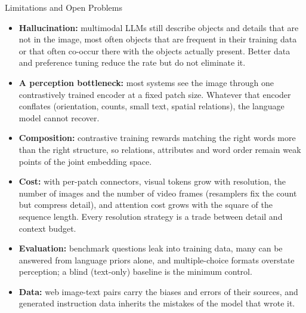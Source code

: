 \begin{frame}{Limitations and Open Problems}
  \begin{itemize}\footnotesize\itemsep0.3em
    \item \textbf{Hallucination:} multimodal LLMs still describe objects and details that are not in the image, most often objects that are frequent in their training data or that often co-occur there with the objects actually present. Better data and preference tuning reduce the rate but do not eliminate it.
    \item \textbf{A perception bottleneck:} most systems see the image through one contrastively trained encoder at a fixed patch size. Whatever that encoder conflates (orientation, counts, small text, spatial relations), the language model cannot recover.
    \item \textbf{Composition:} contrastive training rewards matching the right words more than the right structure, so relations, attributes and word order remain weak points of the joint embedding space.
    \item \textbf{Cost:} with per-patch connectors, visual tokens grow with resolution, the number of images and the number of video frames (resamplers fix the count but compress detail), and attention cost grows with the square of the sequence length. Every resolution strategy is a trade between detail and context budget.
    \item \textbf{Evaluation:} benchmark questions leak into training data, many can be answered from language priors alone, and multiple-choice formats overstate perception; a blind (text-only) baseline is the minimum control.
    \item \textbf{Data:} web image-text pairs carry the biases and errors of their sources, and generated instruction data inherits the mistakes of the model that wrote it.
  \end{itemize}
\end{frame}
